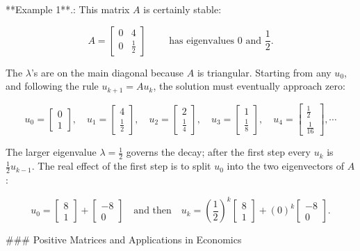 

**Example 1**.: This matrix \(A\) is certainly stable:

\[A=\begin{bmatrix}0&4\\ 0&\frac{1}{2}\end{bmatrix}\qquad\text{ has eigenvalues 0 and }\frac{1}{2}.\]

The \(\lambda\)'s are on the main diagonal because \(A\) is triangular. Starting from any \(u_{0}\), and following the rule \(u_{k+1}=Au_{k}\), the solution must eventually approach zero:

\[u_{0}=\begin{bmatrix}0\\ 1\end{bmatrix},\quad u_{1}=\begin{bmatrix}4\\ \frac{1}{2}\end{bmatrix},\quad u_{2}=\begin{bmatrix}2\\ \frac{1}{4}\end{bmatrix},\quad u_{3}=\begin{bmatrix}1\\ \frac{1}{8}\end{bmatrix},\quad u_{4}=\begin{bmatrix}\frac{1}{2}\\ \frac{1}{16}\end{bmatrix},\cdots\]

The larger eigenvalue \(\lambda=\frac{1}{2}\) governs the decay; after the first step every \(u_{k}\) is \(\frac{1}{2}u_{k-1}\). The real effect of the first step is to split \(u_{0}\) into the two eigenvectors of \(A\):

\[u_{0}=\begin{bmatrix}8\\ 1\end{bmatrix}+\begin{bmatrix}-8\\ 0\end{bmatrix}\quad\text{and then}\quad u_{k}=\left(\frac{1}{2}\right)^{k} \begin{bmatrix}8\\ 1\end{bmatrix}+(0)^{k}\begin{bmatrix}-8\\ 0\end{bmatrix}.\]

### Positive Matrices and Applications in Economics

